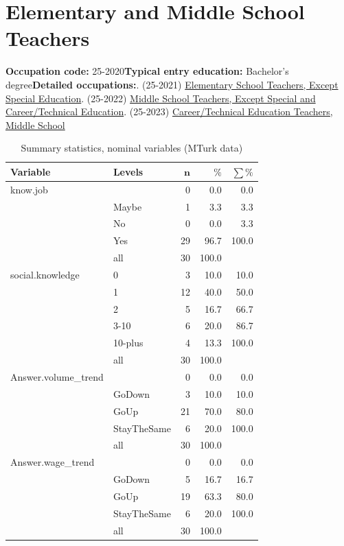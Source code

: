\documentclass[a4paper,10pt]{article}\usepackage[]{graphicx}\usepackage[]{color}
\begin{document}
\newpage\section{Elementary and Middle School Teachers}\textbf{Occupation code:} 25-2020\newline\textbf{Typical entry education:} Bachelor's degree\newline\textbf{Detailed occupations:}. (25-2021)  \href{http://www.bls.gov/oes/current/oes252021.htm}{Elementary School Teachers, Except Special Education}. (25-2022)  \href{http://www.bls.gov/oes/current/oes252022.htm}{Middle School Teachers, Except Special and Career/Technical Education}. (25-2023)  \href{http://www.bls.gov/oes/current/oes252023.htm}{Career/Technical Education Teachers, Middle School}\newline%
\begin{table}[ht]
\centering
{\footnotesize
\begin{tabular}{ll|rrr}
 \textbf{Variable} & \textbf{Levels} & $\mathbf{n}$ & $\mathbf{\%}$ & $\mathbf{\sum \%}$ \\ 
  \hline
know.job &  & 0 & 0.0 & 0.0 \\ 
   & Maybe & 1 & 3.3 & 3.3 \\ 
   & No & 0 & 0.0 & 3.3 \\ 
   & Yes & 29 & 96.7 & 100.0 \\ 
   \hline
 & all & 30 & 100.0 &  \\ 
   \hline
\hline
social.knowledge & 0 & 3 & 10.0 & 10.0 \\ 
   & 1 & 12 & 40.0 & 50.0 \\ 
   & 2 & 5 & 16.7 & 66.7 \\ 
   & 3-10 & 6 & 20.0 & 86.7 \\ 
   & 10-plus & 4 & 13.3 & 100.0 \\ 
   \hline
 & all & 30 & 100.0 &  \\ 
   \hline
\hline
Answer.volume\_trend &  & 0 & 0.0 & 0.0 \\ 
   & GoDown & 3 & 10.0 & 10.0 \\ 
   & GoUp & 21 & 70.0 & 80.0 \\ 
   & StayTheSame & 6 & 20.0 & 100.0 \\ 
   \hline
 & all & 30 & 100.0 &  \\ 
   \hline
\hline
Answer.wage\_trend &  & 0 & 0.0 & 0.0 \\ 
   & GoDown & 5 & 16.7 & 16.7 \\ 
   & GoUp & 19 & 63.3 & 80.0 \\ 
   & StayTheSame & 6 & 20.0 & 100.0 \\ 
   \hline
 & all & 30 & 100.0 &  \\ 
   \hline
\hline
\end{tabular}
}
\caption{Summary statistics, nominal variables (MTurk data)} 
\label{tab1:25-2020}
\end{table}
\end{document}
